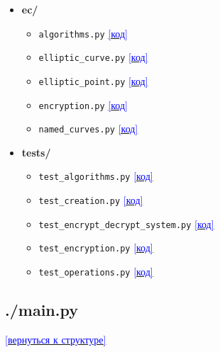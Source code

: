 \begin{itemize}
\begin{itemize}
\begin{itemize}
\begin{itemize}
				\item \texttt{key\_pair\_logic.py} \dotfill \hyperref[sec:windows_logic_key_pair]{\textcolor{blue}{[код]}}
			\end{itemize}
		\end{itemize}
		\item \textbf{ec/}
		\begin{itemize}
			\item \texttt{algorithms.py} \dotfill \hyperref[sec:ec_algorithms]{\textcolor{blue}{[код]}}
			\item \texttt{elliptic\_curve.py} \dotfill \hyperref[sec:ec_elliptic_curve]{\textcolor{blue}{[код]}}
			\item \texttt{elliptic\_point.py} \dotfill \hyperref[sec:ec_elliptic_point]{\textcolor{blue}{[код]}}
			\item \texttt{encryption.py} \dotfill \hyperref[sec:ec_encryption]{\textcolor{blue}{[код]}}
			\item \texttt{named\_curves.py} \dotfill \hyperref[sec:ec_named_curves]{\textcolor{blue}{[код]}}
		\end{itemize}
		\item \textbf{tests/}
		\begin{itemize}
			\item \texttt{test\_algorithms.py} \dotfill \hyperref[sec:tests_algorithms]{\textcolor{blue}{[код]}}
			\item \texttt{test\_creation.py} \dotfill \hyperref[sec:tests_creation]{\textcolor{blue}{[код]}}
			\item \texttt{test\_encrypt\_decrypt\_system.py} \dotfill \hyperref[sec:tests_encrypt_decrypt_system]{\textcolor{blue}{[код]}}
			\item \texttt{test\_encryption.py} \dotfill \hyperref[sec:tests_encryption]{\textcolor{blue}{[код]}}
			\item \texttt{test\_operations.py} \dotfill \hyperref[sec:tests_operations]{\textcolor{blue}{[код]}}
		\end{itemize}
	\end{itemize}
\end{itemize}

\label{sec:main}
\subsection*{./main.py}
\noindent\hyperref[sec:appendix]{\textcolor{blue}{[вернуться к структуре]}}
\vspace{0.5em}
\inputminted{python}{../main.py}

